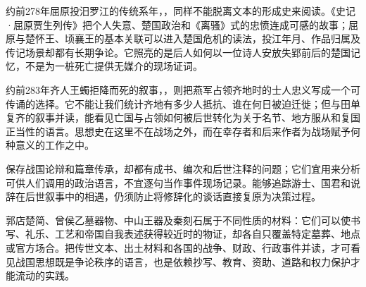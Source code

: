 约前278年屈原投汨罗江的传统系年，，同样不能脱离文本的形成史来阅读。《史记·屈原贾生列传》把个人失意、楚国政治和《离骚》式的忠愤连成可感的故事；屈原与楚怀王、顷襄王的基本关联可以进入楚国危机的读法，投江年月、作品归属及传记场景却都有长期争论。它照亮的是后人如何以一位诗人安放失郢前后的楚国记忆，不是为一桩死亡提供无媒介的现场证词。

约前283年齐人王蠋拒降而死的叙事，，则把燕军占领齐地时的士人忠义写成一个可传诵的选择。它不能让我们统计齐地有多少人抵抗、谁在何日被迫迁徙；但与田单复齐的叙事并读，能看见亡国与占领如何被后世转化为关于名节、地方服从和复国正当性的语言。思想史在这里不在战场之外，而在幸存者和后来作者为战场赋予何种意义的工作之中。

\begin{sourcenote}[怎样把思想材料放回事件中]
保存战国论辩和篇章传承，却都有成书、编次和后世注释的问题；它们宜用来分析可供人们调用的政治语言，不宜逐句当作事件现场记录。能够追踪游士、国君和说辞在后世叙事中的相遇，仍须防止将修辞化的谈话直接复原为决策过程。

郭店楚简、曾侯乙墓器物、中山王器及秦刻石属于不同性质的材料：它们可以使书写、礼乐、工艺和帝国自我表述获得较近时的物证，却各自只覆盖特定墓葬、地点或官方场合。把传世文本、出土材料和各国的战争、财政、行政事件并读，才可看见战国思想既是争论秩序的语言，也是依赖抄写、教育、资助、道路和权力保护才能流动的实践。
\end{sourcenote}
